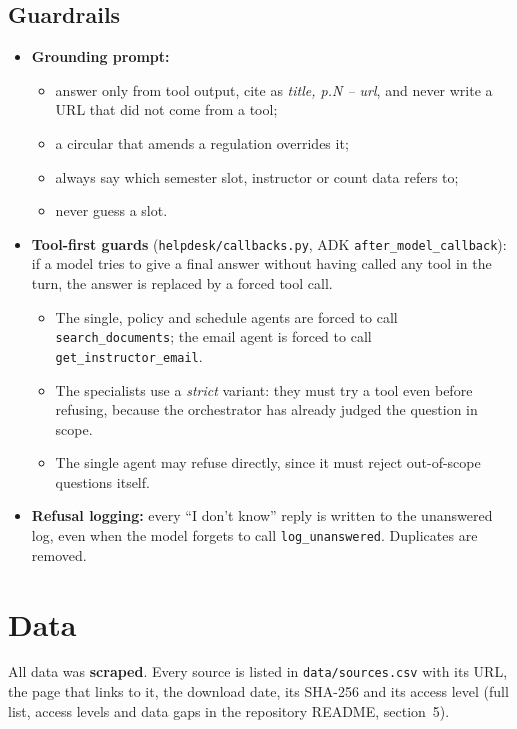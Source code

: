 \documentclass[11pt,a4paper]{article}
\newcommand{\code}[1]{\texttt{#1}}
\begin{document}
\subsection{Guardrails}
\begin{itemize}
  \item \textbf{Grounding prompt:}
    \begin{itemize}
      \item answer only from tool output, cite as \emph{title, p.N -- url}, and never write a URL that did not
            come from a tool;
      \item a circular that amends a regulation overrides it;
      \item always say which semester slot, instructor or count data refers to;
      \item never guess a slot.
    \end{itemize}
  \item \textbf{Tool-first guards} (\code{helpdesk/callbacks.py}, ADK \code{after\_model\_callback}): if a model
        tries to give a final answer without having called any tool in the turn, the answer is replaced by a
        forced tool call.
    \begin{itemize}
      \item The single, policy and schedule agents are forced to call \code{search\_documents}; the email agent
            is forced to call \code{get\_instructor\_email}.
      \item The specialists use a \emph{strict} variant: they must try a tool even before refusing, because the
            orchestrator has already judged the question in scope.
      \item The single agent may refuse directly, since it must reject out-of-scope questions itself.
    \end{itemize}
  \item \textbf{Refusal logging:} every ``I don't know'' reply is written to the unanswered log, even when the
        model forgets to call \code{log\_unanswered}. Duplicates are removed.
\end{itemize}

\section{Data}
All data was \textbf{scraped}. Every source is listed in \code{data/sources.csv} with its URL, the page that links
to it, the download date, its SHA-256 and its access level (full list, access levels and data gaps in the repository README, section~5).
\end{document}
